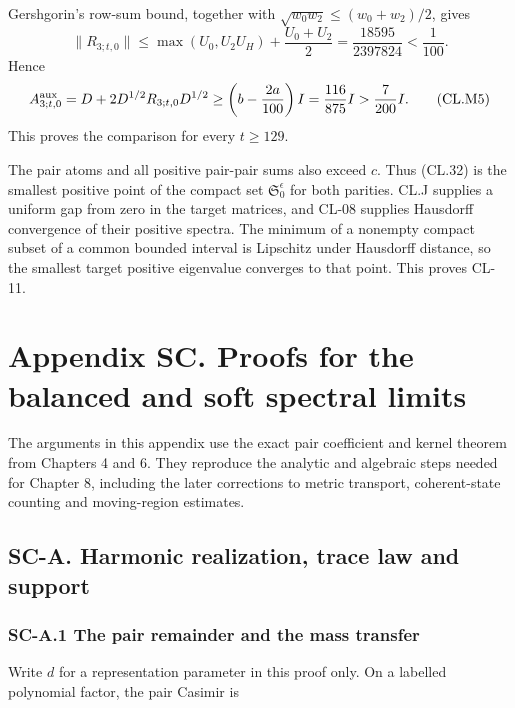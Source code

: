 \documentclass[a4paper,11pt]{article}
\numberwithin{equation}{section}
\begin{document}
Gershgorin's row-sum bound, together with \(\sqrt{w_0w_2}\leq(w_0+w_2)/2\), gives \[
\|R_{3;t,0}\|
\leq\max(U_0,U_2U_H)+\frac{U_0+U_2}{2}
=\frac{18595}{2397824}<\frac1{100}.
\tag{CL.M4}
\] Hence \[
A_{3;t,0}^{\rm aux}=D+2D^{1/2}R_{3;t,0}D^{1/2}
\geq\left(b-\frac{2a}{100}\right)I
=\frac{116}{875}I>\frac7{200}I.
\tag{CL.M5}
\] This proves the comparison for every \(t\geq129\).

The pair atoms and all positive pair-pair sums also exceed \(c\). Thus (CL.32) is the smallest positive point of the compact set \(\mathfrak S_0^\epsilon\) for both parities. CL.J supplies a uniform gap from zero in the target matrices, and CL-08 supplies Hausdorff convergence of their positive spectra. The minimum of a nonempty compact subset of a common bounded interval is Lipschitz under Hausdorff distance, so the smallest target positive eigenvalue converges to that point. This proves CL-11.

\clearpage
\hypertarget{appendix-sc.-proofs-for-the-balanced-and-soft-spectral-limits}{%
\section{Appendix SC. Proofs for the balanced and soft spectral limits}\label{appendix-sc.-proofs-for-the-balanced-and-soft-spectral-limits}}

The arguments in this appendix use the exact pair coefficient and kernel theorem from Chapters 4 and 6. They reproduce the analytic and algebraic steps needed for Chapter 8, including the later corrections to metric transport, coherent-state counting and moving-region estimates.

\hypertarget{sc-a.-harmonic-realization-trace-law-and-support}{%
\subsection{SC-A. Harmonic realization, trace law and support}\label{sc-a.-harmonic-realization-trace-law-and-support}}

\hypertarget{sc-a.1-the-pair-remainder-and-the-mass-transfer}{%
\subsubsection{SC-A.1 The pair remainder and the mass transfer}\label{sc-a.1-the-pair-remainder-and-the-mass-transfer}}

Write \(d\) for a representation parameter in this proof only. On a labelled polynomial factor, the pair Casimir is
\end{document}
